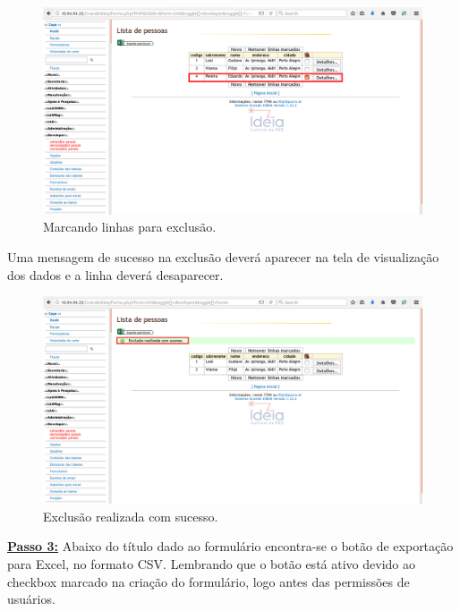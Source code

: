 \documentclass[9pt]{report}
\begin{document}
{      \begin{figure}[H]
        \includegraphics[width=\textwidth]{2_Formularios/2_Criacao_de_formularios/20.png}
        \caption{Marcando linhas para exclusão.}
        \label{fig:linhamarcada}
      \end{figure}
      
      Uma mensagem de sucesso na exclusão deverá aparecer na tela de
      visualização dos dados e a linha deverá desaparecer.
      
      \begin{figure}[H]
        \includegraphics[width=\textwidth]{2_Formularios/2_Criacao_de_formularios/21.png}
        \caption{Exclusão realizada com sucesso.}
        \label{fig:exclusaosucesso}
      \end{figure}

      \underline{\textbf{Passo 3:}} Abaixo do título dado ao
      formulário encontra-se o botão de exportação para Excel, no
      formato CSV. Lembrando que o botão está ativo devido ao
      checkbox marcado na criação do formulário, logo antes das
      permissões de usuários.

}
\end{document}
